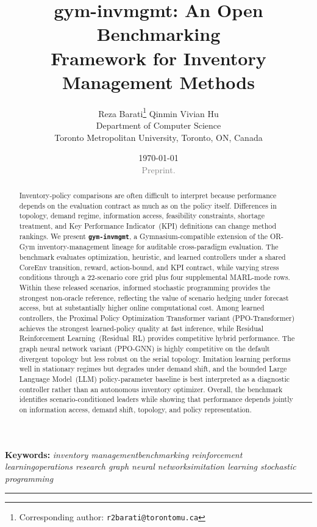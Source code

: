 \documentclass[10pt,a4paper]{article}
\title{\textbf{gym-invmgmt: An Open Benchmarking\\[4pt]
       Framework for Inventory Management Methods}}
\author{%
  Reza Barati\thanks{Corresponding author:
  \texttt{r2barati@torontomu.ca}}
  \quad Qinmin Vivian Hu\\[4pt]
  \small Department of Computer Science\\[-1pt]
  \small Toronto Metropolitan University, Toronto, ON, Canada
}
\date{%
  \small\today\\[4pt]
  \small\textcolor{gray}{Preprint.}%
}
\begin{document}
\maketitle
\thispagestyle{fancy}

\begin{abstract}
\noindent
Inventory-policy comparisons are often difficult to interpret because
performance depends on the evaluation contract as much as on the policy
itself. Differences in topology, demand regime, information access,
feasibility constraints, shortage treatment, and Key Performance
Indicator~(KPI) definitions can change method rankings. We present
\textbf{\texttt{gym-invmgmt}}, a
Gymnasium-compatible extension of the OR-Gym inventory-management lineage for auditable
cross-paradigm evaluation. The benchmark evaluates optimization,
heuristic, and learned controllers under a shared CoreEnv transition,
reward, action-bound, and KPI contract, while varying stress conditions
through a 22-scenario core grid plus four supplemental MARL-mode rows.
Within these released scenarios,
informed stochastic programming provides the strongest non-oracle reference,
reflecting the value of scenario hedging under forecast access, but at
substantially higher online computational cost. Among
learned controllers, the Proximal Policy Optimization Transformer variant
(PPO-Transformer) achieves the strongest learned-policy quality at fast
inference, while Residual Reinforcement Learning~(Residual~RL) provides
competitive hybrid performance. The graph neural network variant
(PPO-GNN) is highly competitive on the default divergent topology but less
robust on the serial topology. Imitation learning performs well in
stationary regimes but degrades under demand shift, and the bounded Large
Language Model~(LLM) policy-parameter baseline is best interpreted as a
diagnostic controller rather than an autonomous inventory optimizer.
Overall, the benchmark identifies scenario-conditioned leaders
while showing that performance depends jointly on information access, demand
shift, topology, and policy representation.
\end{abstract}

\smallskip
\noindent\textbf{Keywords:}\;
\textit{inventory management\;\textbullet\;benchmarking\;\textbullet\;
reinforcement learning\;\textbullet\;operations research\;\textbullet\;
graph neural networks\;\textbullet\;imitation learning\;\textbullet\;
stochastic programming}

\vspace{0.3em}
\noindent\rule{\textwidth}{0.3pt}
\vspace{0.5em}
\end{document}
